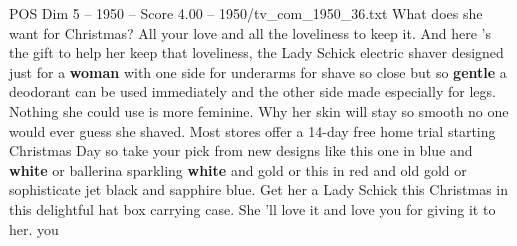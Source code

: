 \begin{textsample}{POS Dim 5 – 1950 – Score 4.00 – 1950/tv\_com\_1950\_36.txt}  \label{ex:f5_pos_045}
What does she want for Christmas?
All your love and all the loveliness to keep it.
And here 's the gift to help her keep that loveliness, the Lady Schick electric shaver designed just for a \textbf{woman} with one side for underarms for shave so close but so \textbf{gentle} a deodorant can be used immediately and the other side made especially for legs.
Nothing she could use is more feminine.
Why her skin will stay so smooth no one would ever guess she shaved.
Most stores offer a 14-day free home trial starting Christmas Day so take your pick from new designs like this one in blue and \textbf{white} or ballerina sparkling \textbf{white} and gold or this in red and old gold or sophisticate jet black and sapphire blue.
Get her a Lady Schick this Christmas in this delightful hat box carrying case.
She 'll love it and love you for giving it to her. you

\end{textsample}
